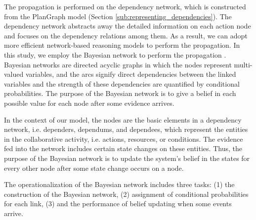The propagation is performed on the dependency network, which is constructed from the PlanGraph model (Section \ref{sub:representing_dependencies}). The dependency network abstracts away the detailed information on each action node and focuses on the dependency relations among them. As a result, we can adopt more efficient network-based reasoning models to perform the propagation. In this study, we employ the Bayesian network to perform the propagation \cite{pearl1988probabilistic}. Bayesian networks are directed acyclic graphs in which the nodes represent multi-valued variables, and the arcs signify direct dependencies between the linked variables and the strength of these dependencies are quantified by conditional probabilities. The purpose of the Bayesian network is to give a belief in each possible value for each node after some evidence arrives.

In the context of our model, the nodes are the basic elements in a dependency network, i.e. dependers, dependums, and dependees, which represent the entities in the collaborative activity, i.e.  actions, resources, or conditions. The evidence fed into the network includes certain state changes on these entities. Thus, the purpose of the Bayesian network is to update the system’s belief in the states for every other node after some state change occurs on a node.

The operationalization of the Bayesian network includes three tasks: (1) the construction of the Bayesian network, (2) assignment of conditional probabilities for each link, (3) and the performance of belief updating when some events arrive.

